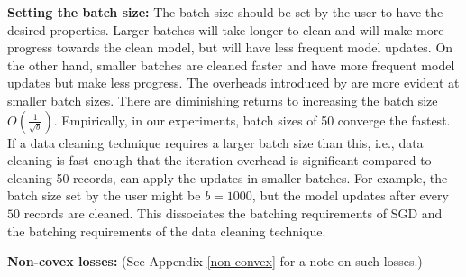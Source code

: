 \vspace{0.25em}

\noindent\textbf{ Setting the batch size: } The batch size should be set by the user to have the desired properties.
Larger batches will take longer to clean and will make more progress towards the clean model, but will have less frequent model updates.
On the other hand, smaller batches are cleaned faster and have more frequent model updates but make less progress.
The overheads introduced by \sys are more evident at smaller batch sizes.
There are diminishing returns to increasing the batch size $O(\frac{1}{\sqrt{b}})$.
Empirically, in our experiments, batch sizes of 50 converge the fastest.
If a data cleaning technique requires a larger batch size than this, i.e., data cleaning is fast enough that the iteration overhead is significant compared to cleaning 50 records, \sys can apply the updates in smaller batches.
For example, the batch size set by the user might be $b=1000$, but the model updates after every $50$ records are cleaned.
This dissociates the batching requirements of SGD and the batching requirements of the data cleaning technique.

\vspace{0.5em}

\noindent\textbf{ Non-covex losses: } (See Appendix \ref{non-convex} for a note on such losses.)


